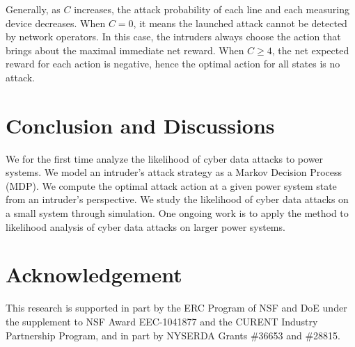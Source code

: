\documentclass[conference,letterpaper,10pt]{IEEEtran}
\begin{document}
Generally, as $C$ increases, the attack probability of each line and each measuring device decreases. When $C=0$, it means the launched attack cannot be detected by network operators. In this case, the intruders always choose the action that brings about the maximal immediate net reward. When $C\geq 4$, the net expected reward for each action is negative, hence the optimal action for all states is no attack.  


\section{Conclusion and Discussions}\label{sec:con}
We for the first time analyze the likelihood of cyber data attacks to power systems. We model an intruder's attack strategy as a Markov Decision Process (MDP). We compute the optimal attack action at a given power system state from an intruder's perspective. We study the likelihood of cyber data attacks on a small system through simulation.
One ongoing work is to apply the method to likelihood analysis of cyber data attacks on larger power systems.

\section*{Acknowledgement}
This research is supported in part by the ERC Program of NSF and DoE under the supplement to 
NSF Award   EEC-1041877 and the CURENT Industry Partnership
Program, and in part by NYSERDA Grants  \#36653 and \#28815. 
\vspace{-3 mm}
\end{document}
